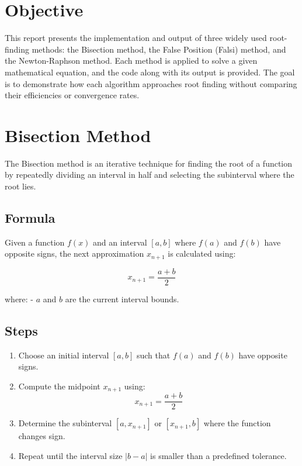 \documentclass{scrreprt}
\begin{document}
\begin{titlepage}
    \date{\today}
    \vfill
\end{titlepage}

\section*{Objective}
This report presents the implementation and output of three widely used root-finding methods: the Bisection method, the False Position (Falsi) method, and the Newton-Raphson method. Each method is applied to solve a given mathematical equation, and the code along with its output is provided. The goal is to demonstrate how each algorithm approaches root finding without comparing their efficiencies or convergence rates.

\section*{Bisection Method}

The Bisection method is an iterative technique for finding the root of a function by repeatedly dividing an interval in half and selecting the subinterval where the root lies.

\subsection*{Formula}

Given a function \( f(x) \) and an interval \([a, b]\) where \( f(a) \) and \( f(b) \) have opposite signs, the next approximation \( x_{n+1} \) is calculated using:

\begin{equation}
x_{n+1} = \frac{a + b}{2}
\end{equation}

where:
- \( a \) and \( b \) are the current interval bounds.

\subsection*{Steps}

\begin{enumerate}
    \item Choose an initial interval \([a, b]\) such that \( f(a) \) and \( f(b) \) have opposite signs.
    \item Compute the midpoint \( x_{n+1} \) using:
    \begin{equation}
    x_{n+1} = \frac{a + b}{2}
    \end{equation}
    \item Determine the subinterval \([a, x_{n+1}]\) or \([x_{n+1}, b]\) where the function changes sign.
    \item Repeat until the interval size \( |b - a| \) is smaller than a predefined tolerance.
\end{enumerate}
\end{document}
